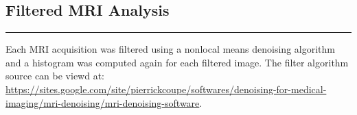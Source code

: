 \pagebreak

\subsection*{Filtered MRI Analysis}
	\vspace*{-0.5cm}\rule{5cm}{0.1mm}
	
	\Large{Each MRI acquisition was filtered using a nonlocal means denoising algorithm and a histogram was computed again for each filtered image. The filter algorithm source can be viewd at: \url{https://sites.google.com/site/pierrickcoupe/softwares/denoising-for-medical-imaging/mri-denoising/mri-denoising-software}.} 
	
    \begin{figure}[!h]
        \centering
            \begin{minipage}{0.17\linewidth}%
                
            \end{minipage}
            \begin{minipage}{0.17\linewidth}%
                
            \end{minipage}
            \begin{minipage}{0.17\linewidth}%
                
            \end{minipage}
            \begin{minipage}{0.17\linewidth}%
                
            \end{minipage}
            \begin{minipage}{0.17\linewidth}%
                
            \end{minipage}
            \vspace{-0.8cm}
    \end{figure}

